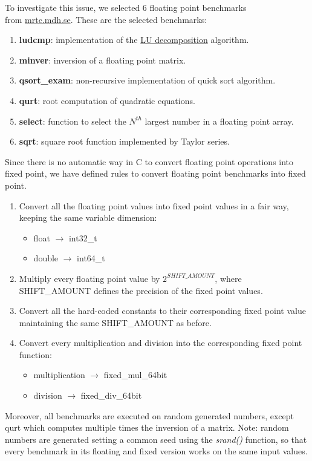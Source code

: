 To investigate this issue, we selected 6 floating point benchmarks \\ from \href{http://www.mrtc.mdh.se/projects/wcet/benchmarks.html}{mrtc.mdh.se}.
These are the selected benchmarks:
\begin{enumerate}
	\item \textbf{ludcmp}: implementation of the \href{https://en.wikipedia.org/wiki/LU_decomposition}{LU decomposition} algorithm.
	\item \textbf{minver}: inversion of a floating point matrix.
	\item \textbf{qsort\_exam}: non-recursive implementation of quick sort algorithm.
	\item \textbf{qurt}: root computation of quadratic equations.
	\item \textbf{select}: function to select the ${N}^{th}$ largest number in a floating point array.
	\item \textbf{sqrt}: square root function implemented by Taylor series.
\end{enumerate}
Since there is no automatic way in C to convert floating point operations into fixed point, we have defined rules to convert floating point benchmarks into fixed point.
\begin{enumerate}
	\item Convert all the floating point values into fixed point values in a fair way, keeping the same variable dimension:
	\begin{itemize}
		\item float $\rightarrow$ int32\_t	
		\item double $\rightarrow$ int64\_t
	\end{itemize}
	\item Multiply every floating point value by ${2}^{SHIFT\_AMOUNT}$, where \\SHIFT\_AMOUNT defines the precision of the fixed point values.
	\item Convert all the hard-coded constants to their corresponding fixed point value maintaining the same SHIFT\_AMOUNT as before.
	\item Convert every multiplication and division into the corresponding fixed point function:
	\begin{itemize}
		\item multiplication $\rightarrow$ fixed\_mul\_64bit	
		\item division $\rightarrow$ fixed\_div\_64bit
	\end{itemize}
\end{enumerate}
Moreover, all benchmarks are executed on random generated numbers, except qurt which computes multiple times the inversion of a matrix.\newline
Note: random numbers are generated setting a common seed using the \textit{srand()} function, so that every benchmark in its floating and fixed version works on the same input values.
